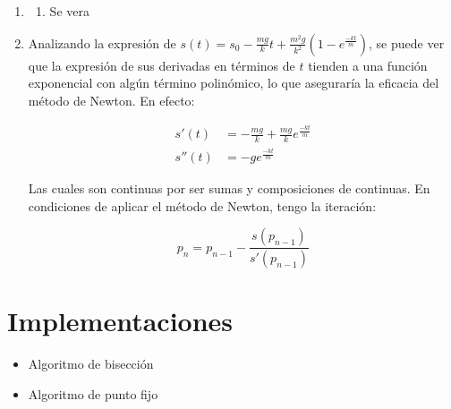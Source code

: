 \documentclass[DIN, pagenumber=false, fontsize=11pt, parskip=half]{scrartcl}
\begin{document}
\begin{enumerate}
\begin{enumerate}
        \item Analizando $g''(x) = - \frac{2}{9 \sqrt[3]{{(x+1)}^5}}$ se puede ver que $g'$ tiene como máximo
        $g'(0) = \frac{1}{3}$. Luego, basta tomar $k=\frac{1}{2}$ para acotar el error. Como sigue:

        \begin{align*}
            |e_n| \le k^n \max \{p_0 - a, b - p_0\} &< 10^{-3} \\
            10^3 \max \{ p_0 - a, b - p_0 \} < \frac{1}{k^n} \\
            \frac{1}{\log_2 (\frac{1}{k})} \cdot 10^3 \max \{ p_0 - a, b - p_0 \} < n
        \end{align*}

        Usando el intervalo inicial $[0,2]$ con $p_0=1$ y $k=\frac{1}{2}$, se tiene que:

        \[ 10^3 < n \]

        Ejecutando el algoritmo con esos parámetros se obtiene $x \approx 1.32$.
    \end{enumerate}

    \item 
        \begin{enumerate}
            \item Se vera
        \end{enumerate}

    \item Analizando la expresión de $s(t) = s_0 - \frac{mg}{k}t + \frac{m^2 g}{k^2} (1 - e^{\frac{-kt}{m}})$,
    se puede ver que la expresión de sus derivadas en términos de $t$ tienden a una función exponencial con algún término polinómico, lo que aseguraría la eficacia del
    método de Newton. En efecto:

    \begin{align*}
        s'(t) &= - \frac{mg}{k} + \frac{mg}{k} e^{\frac{-kt}{m}} \\
        s''(t) &= - g e^{\frac{-kt}{m}}
    \end{align*}

    Las cuales son continuas por ser sumas y composiciones de continuas.
    En condiciones de aplicar el método de Newton, tengo la iteración:

    \[ p_n = p_{n-1} - \frac{s(p_{n-1})}{s'(p_{n-1})} \]

    
\end{enumerate}

\newpage

\section{Implementaciones}

\begin{itemize}
    \item Algoritmo de bisección
    

    \item Algoritmo de punto fijo
    
\end{itemize}
\end{document}
